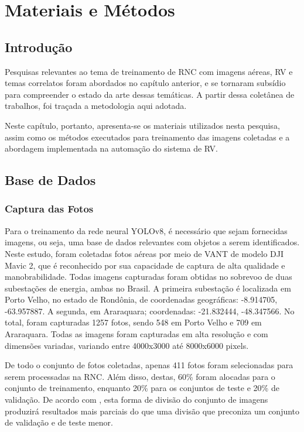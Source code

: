 \chapter{Materiais e Métodos}

\section{Introdução}

Pesquisas relevantes ao tema de treinamento de RNC com imagens aéreas, RV e temas correlatos foram abordados no capítulo anterior, e se tornaram subsídio para compreender o estado da arte dessas temáticas. A partir dessa coletânea de trabalhos, foi traçada a metodologia aqui adotada.

Neste capítulo, portanto, apresenta-se os materiais utilizados nesta pesquisa, assim como os métodos executados para treinamento das imagens coletadas e a abordagem implementada na automação do sistema de RV.

\section{Base de Dados}

\subsection{Captura das Fotos}

Para o treinamento da rede neural YOLOv8, é necessário que sejam fornecidas imagens, ou seja, uma base de dados relevantes com objetos a serem identificados. Neste estudo, foram coletadas fotos aéreas por meio de VANT de modelo DJI Mavic 2, que é reconhecido por sua capacidade de captura de alta qualidade e manobrabilidade. Todas imagens capturadas foram obtidas no sobrevoo de duas subestações de energia, ambas no Brasil. A primeira subestação é localizada em Porto Velho, no estado de Rondônia, de coordenadas geográficas: -8.914705, -63.957887. A segunda, em Araraquara; coordenadas: -21.832444, -48.347566. No total, foram capturadas 1257 fotos, sendo  548 em Porto Velho e 709 em Araraquara. Todas as imagens foram capturadas em alta resolução e com dimensões variadas, variando entre 4000x3000 até 8000x6000 pixels. 

De todo o conjunto de fotos coletadas, apenas 411 fotos foram selecionadas para serem processadas na RNC. Além disso, destas, 60\% foram alocadas para o conjunto de treinamento, enquanto 20\% para os conjuntos de teste e 20\% de validação. De acordo com \cite{itsmeSamrat2024}, esta forma de divisão do conjunto de imagens produzirá resultados mais parciais do que uma divisão que preconiza um conjunto de validação e de teste menor.

